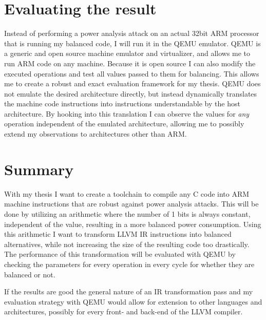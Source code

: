 \documentclass{article}
\newcommand{\qemu}{QEMU}
\begin{document}
\section{Evaluating the result}
\label{evaluation}
Instead of performing a power analysis attack on an actual 32bit ARM processor that is running my balanced code, I will run it in the \qemu{} emulator.
\qemu{} is a generic and open source machine emulator and virtualizer\cite{bellard2005qemu}, and allows me to run ARM code on any machine.
Because it is open source I can also modify the executed operations and test all values passed to them for balancing.
This allows me to create a robust and exact evaluation framework for my thesis.
\qemu{} does not emulate the desired architecture directly, but instead dynamically translates the machine code instructions into instructions understandable by the host architecture.
By hooking into this translation I can observe the values for \emph{any} operation independent of the emulated architecture, allowing me to possibly extend my observations to architectures other than ARM.

\section{Summary}
With my thesis I want to create a toolchain to compile any C code into ARM machine instructions that are robust against power analysis attacks.
This will be done by utilizing an arithmetic where the number of 1 bits is always constant, independent of the value, resulting in a more balanced power consumption.
Using this arithmetic I want to transform LLVM IR instructions into balanced alternatives, while not increasing the size of the resulting code too drastically.
The performance of this transformation will be evaluated with \qemu{} by checking the parameters for every operation in every cycle for whether they are balanced or not.

If the results are good the general nature of an IR transformation pass and my evaluation strategy with \qemu{} would allow for extension to other languages and architectures, possibly for every front- and back-end of the LLVM compiler.



\end{document}

